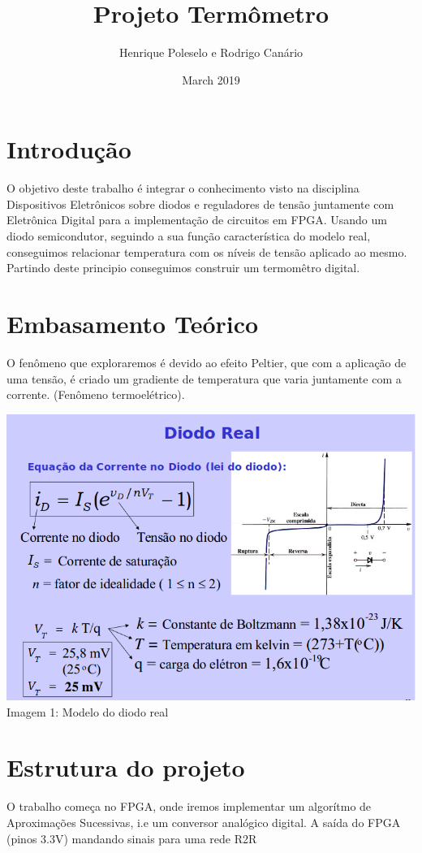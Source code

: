 \documentclass{article}
\title{Projeto Termômetro}
\author{Henrique Poleselo e Rodrigo Canário}
\date{March 2019}
\begin{document}
\maketitle

\section{Introdução}
O objetivo deste trabalho é integrar o conhecimento visto na disciplina Dispositivos Eletrônicos sobre diodos e reguladores de tensão juntamente com Eletrônica Digital para a implementação de circuitos em FPGA.
Usando um diodo semicondutor, seguindo a sua função característica do modelo real, conseguimos relacionar temperatura com os níveis de tensão aplicado ao mesmo. Partindo deste principio conseguimos construir um termomêtro digital.

\section{Embasamento Teórico}
 O fenômeno que exploraremos é devido ao efeito Peltier, que com a aplicação de uma tensão, é criado um gradiente de temperatura que varia juntamente com a corrente. (Fenômeno termoelétrico).
\begin{center}
    \includegraphics[scale=0.5]{images/img1.png}
    Imagem 1: Modelo do diodo real
\end{center}

\section{Estrutura do projeto}
O trabalho começa no FPGA, onde iremos implementar um algorítmo de Aproximações Sucessivas, i.e um conversor analógico digital. A saída do FPGA (pinos 3.3V) mandando sinais para uma rede R2R
\end{document}
